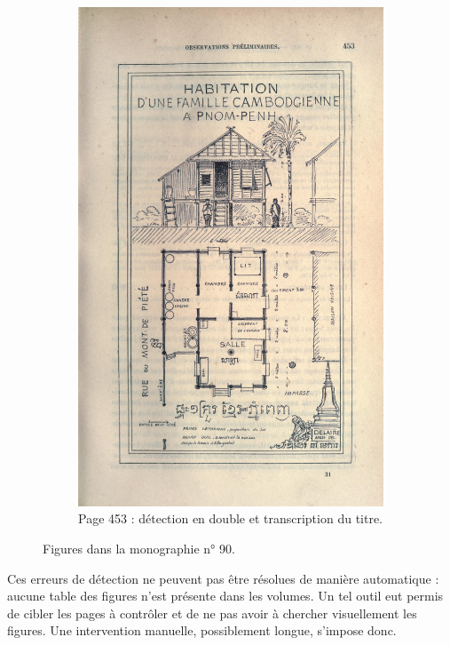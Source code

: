 \begin{figure}
\begin{subfigure}{0.4\textwidth}
     \includegraphics[width=1\linewidth]{img/odm90_453.jpg}
     \caption{Page 453 : détection en double et transcription du titre.}
     \label{fig:odmfig90453}
    \end{subfigure}
    \caption{Figures dans la monographie n° 90.}
    \label{fig:odmfig90}
\end{figure}

Ces erreurs de détection ne peuvent pas être résolues de manière automatique : aucune table des figures n'est présente dans les volumes. Un tel outil eut permis de cibler les pages à contrôler et de ne pas avoir à chercher visuellement les figures. Une intervention manuelle, possiblement longue, s'impose donc.

